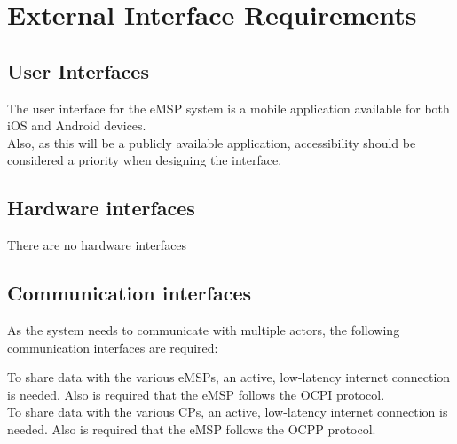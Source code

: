 \clearpage
\newpage



\section{External Interface Requirements}
\subsection{User Interfaces}
The user interface for the eMSP system is a mobile application available for both iOS and Android devices.\\
Also, as this will be a publicly available application, accessibility should be considered a priority when designing the interface.

\subsection{Hardware interfaces}
There are no hardware interfaces

\subsection{Communication interfaces}
As the system needs to communicate with multiple actors, the following communication interfaces are required:

\begin{enumerate}
	To share data with the various eMSPs, an active, low-latency internet connection is needed. Also is required that the eMSP follows the OCPI protocol.\\
   
    To share data with the various CPs, an active, low-latency internet connection is needed. Also is required that the eMSP follows the OCPP protocol.
\end{enumerate}

